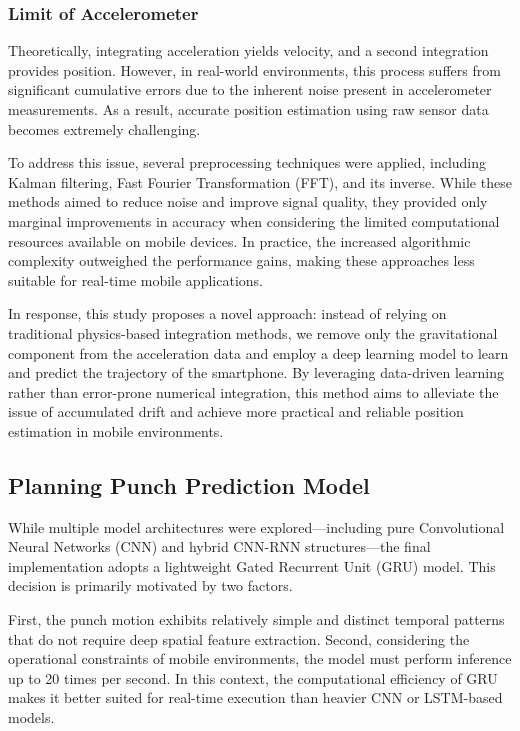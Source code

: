 \documentclass{article}
\begin{document}
\FloatBarrier
\subsubsection{Limit of Accelerometer}
Theoretically, integrating acceleration yields velocity, and a second integration provides position. However, in real-world environments, this process suffers from significant cumulative errors due to the inherent noise present in accelerometer measurements. As a result, accurate position estimation using raw sensor data becomes extremely challenging.

To address this issue, several preprocessing techniques were applied, including Kalman filtering, Fast Fourier Transformation (FFT), and its inverse. While these methods aimed to reduce noise and improve signal quality, they provided only marginal improvements in accuracy when considering the limited computational resources available on mobile devices. In practice, the increased algorithmic complexity outweighed the performance gains, making these approaches less suitable for real-time mobile applications.

In response, this study proposes a novel approach: instead of relying on traditional physics-based integration methods, we remove only the gravitational component from the acceleration data and employ a deep learning model to learn and predict the trajectory of the smartphone. By leveraging data-driven learning rather than error-prone numerical integration, this method aims to alleviate the issue of accumulated drift and achieve more practical and reliable position estimation in mobile environments.

\subsection{Planning Punch Prediction Model}

While multiple model architectures were explored—including pure Convolutional Neural Networks (CNN) and hybrid CNN-RNN structures—the final implementation adopts a lightweight Gated Recurrent Unit (GRU) model. This decision is primarily motivated by two factors.

First, the punch motion exhibits relatively simple and distinct temporal patterns that do not require deep spatial feature extraction. Second, considering the operational constraints of mobile environments, the model must perform inference up to 20 times per second. In this context, the computational efficiency of GRU makes it better suited for real-time execution than heavier CNN or LSTM-based models.
\end{document}
